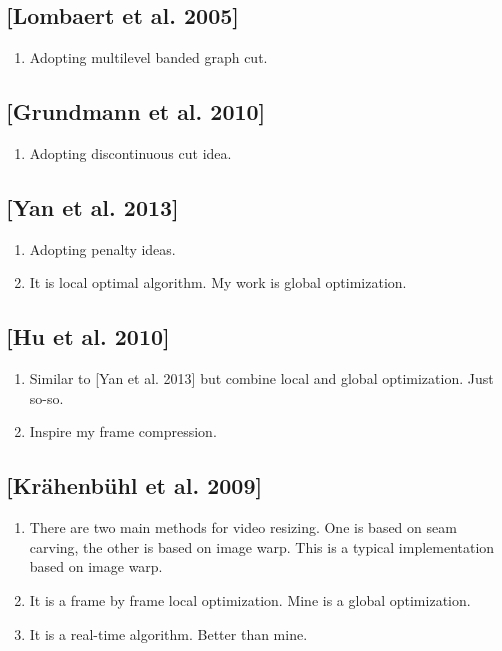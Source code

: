 \documentclass[a4paper, twocolumn]{article}
\begin{document}
		\subsection{[Lombaert et al. 2005]}
		\begin{enumerate}[(1)]
			\item Adopting multilevel banded graph cut.
		\end{enumerate}
		
		\subsection{[Grundmann et al. 2010]}
		\begin{enumerate}[(1)]
			\item Adopting discontinuous cut idea.
		\end{enumerate}

		\subsection{[Yan et al. 2013]}
		\begin{enumerate}[(1)]
			\item Adopting penalty ideas.
			\item It is local optimal algorithm. My work is global optimization.
		\end{enumerate}
		
		\subsection{[Hu et al. 2010]}
		\begin{enumerate}[(1)]
			\item Similar to [Yan et al. 2013] but combine local and global optimization. Just so-so.
			\item Inspire my frame compression.
		\end{enumerate}
		
		\subsection{[Krähenbühl et al. 2009]}
		\begin{enumerate}[(1)]
			\item There are two main methods for video resizing. One is based on seam carving, the other is based on image warp. This is a typical implementation based on image warp.
			\item It is a frame by frame local optimization. Mine is a global optimization.
			\item It is a real-time algorithm. Better than mine.
		\end{enumerate}
	
\end{document}
